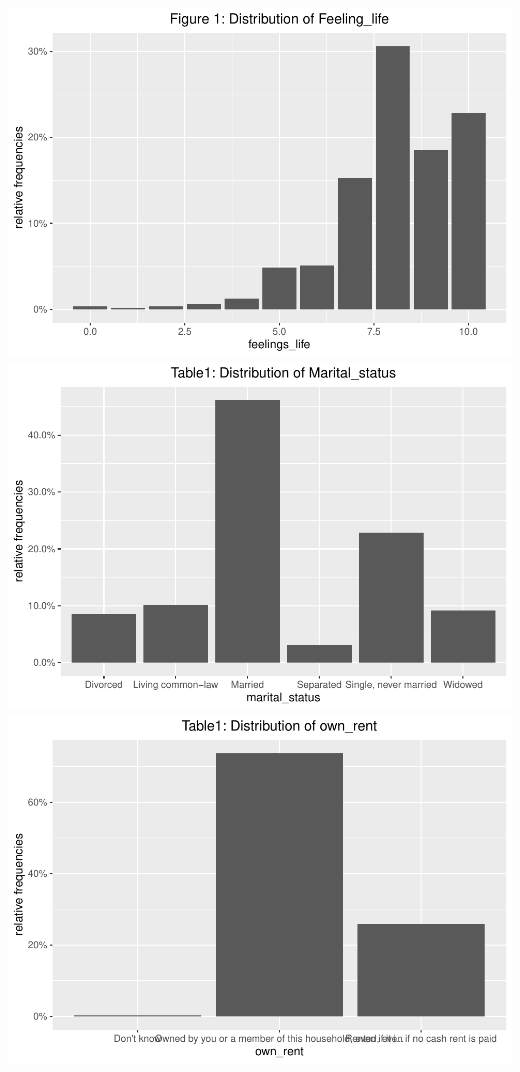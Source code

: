 \documentclass[]{article}
\begin{document}
\includegraphics{ProblemSet2-template_files/figure-latex/unnamed-chunk-3-1.pdf}
\includegraphics{ProblemSet2-template_files/figure-latex/unnamed-chunk-3-2.pdf}
\includegraphics{ProblemSet2-template_files/figure-latex/unnamed-chunk-3-3.pdf}
\end{document}
